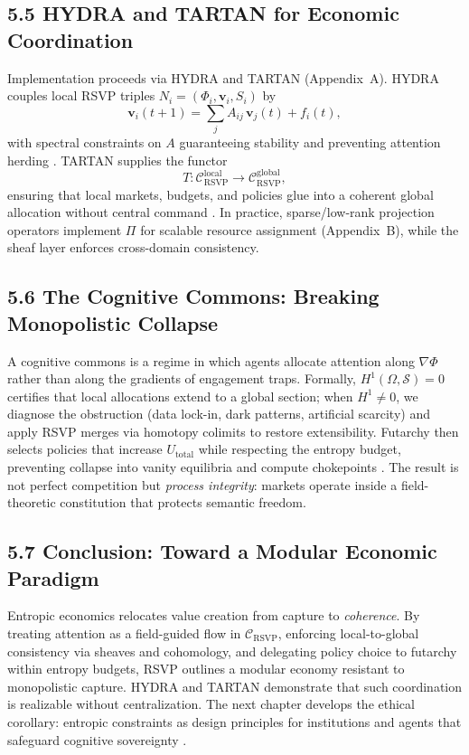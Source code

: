 \documentclass[12pt]{article}
\begin{document}
\subsection*{5.5 HYDRA and TARTAN for Economic Coordination}
Implementation proceeds via HYDRA and TARTAN (Appendix~A). HYDRA couples local
RSVP triples \(N_i=(\Phi_i,\mathbf{v}_i,S_i)\) by
\[
\mathbf{v}_i(t+1) = \sum_j A_{ij}\,\mathbf{v}_j(t) + f_i(t),
\]
with spectral constraints on \(A\) guaranteeing stability and preventing attention
herding \citep{bird1988}. TARTAN supplies the functor
\[
T:\mathcal{C}_{\text{RSVP}}^{\mathrm{local}} \to
\mathcal{C}_{\text{RSVP}}^{\mathrm{global}},
\]
ensuring that local markets, budgets, and policies glue into a coherent global allocation
without central command \citep{milewski2018}. In practice, sparse/low-rank projection
operators implement \(\Pi\) for scalable resource assignment (Appendix~B), while the
sheaf layer enforces cross-domain consistency.

\subsection*{5.6 The Cognitive Commons: Breaking Monopolistic Collapse}
A cognitive commons is a regime in which agents allocate attention along \(\nabla\Phi\)
rather than along the gradients of engagement traps. Formally,
\(H^1(\Omega,\mathcal{S})=0\) certifies that local allocations extend to a global section;
when \(H^1\neq 0\), we diagnose the obstruction (data lock-in, dark patterns, artificial
scarcity) and apply RSVP merges via homotopy colimits to restore extensibility.
Futarchy then selects policies that increase \(U_{\mathrm{total}}\) while respecting the
entropy budget, preventing collapse into vanity equilibria and compute chokepoints
\citep{lanier2018}. The result is not perfect competition but \emph{process integrity}:
markets operate inside a field-theoretic constitution that protects semantic freedom.

\subsection*{5.7 Conclusion: Toward a Modular Economic Paradigm}
Entropic economics relocates value creation from capture to \emph{coherence}.
By treating attention as a field-guided flow in \(\mathcal{C}_{\text{RSVP}}\),
enforcing local-to-global consistency via sheaves and cohomology, and delegating policy
choice to futarchy within entropy budgets, RSVP outlines a modular economy
resistant to monopolistic capture. HYDRA and TARTAN demonstrate that such coordination
is realizable without centralization. The next chapter develops the ethical corollary:
entropic constraints as design principles for institutions and agents that safeguard
cognitive sovereignty \citep{whitehead1978, deleuze1987}.
\end{document}
